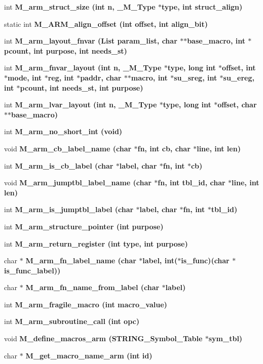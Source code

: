 \begin{CompactItemize}
\item 
int \bf{M\_\-arm\_\-struct\_\-size} (int n, \bf{\_\-M\_\-Type} $\ast$type, int struct\_\-align)
\item 
static int \bf{M\_\-ARM\_\-align\_\-offset} (int offset, int align\_\-bit)
\item 
int \bf{M\_\-arm\_\-layout\_\-fnvar} (\bf{List} param\_\-list, char $\ast$$\ast$base\_\-macro, int $\ast$pcount, int purpose, int needs\_\-st)
\item 
int \bf{M\_\-arm\_\-fnvar\_\-layout} (int n, \bf{\_\-M\_\-Type} $\ast$type, long int $\ast$offset, int $\ast$\bf{mode}, int $\ast$reg, int $\ast$paddr, char $\ast$$\ast$macro, int $\ast$su\_\-sreg, int $\ast$su\_\-ereg, int $\ast$pcount, int needs\_\-st, int purpose)
\item 
int \bf{M\_\-arm\_\-lvar\_\-layout} (int n, \bf{\_\-M\_\-Type} $\ast$type, long int $\ast$offset, char $\ast$$\ast$base\_\-macro)
\item 
int \bf{M\_\-arm\_\-no\_\-short\_\-int} (void)
\item 
void \bf{M\_\-arm\_\-cb\_\-label\_\-name} (char $\ast$fn, int cb, char $\ast$line, int len)
\item 
int \bf{M\_\-arm\_\-is\_\-cb\_\-label} (char $\ast$label, char $\ast$fn, int $\ast$cb)
\item 
void \bf{M\_\-arm\_\-jumptbl\_\-label\_\-name} (char $\ast$fn, int tbl\_\-id, char $\ast$line, int len)
\item 
int \bf{M\_\-arm\_\-is\_\-jumptbl\_\-label} (char $\ast$label, char $\ast$fn, int $\ast$tbl\_\-id)
\item 
int \bf{M\_\-arm\_\-structure\_\-pointer} (int purpose)
\item 
int \bf{M\_\-arm\_\-return\_\-register} (int type, int purpose)
\item 
char $\ast$ \bf{M\_\-arm\_\-fn\_\-label\_\-name} (char $\ast$label, int($\ast$is\_\-func)(char $\ast$is\_\-func\_\-label))
\item 
char $\ast$ \bf{M\_\-arm\_\-fn\_\-name\_\-from\_\-label} (char $\ast$label)
\item 
int \bf{M\_\-arm\_\-fragile\_\-macro} (int macro\_\-value)
\item 
int \bf{M\_\-arm\_\-subroutine\_\-call} (int opc)
\item 
void \bf{M\_\-define\_\-macros\_\-arm} (\bf{STRING\_\-Symbol\_\-Table} $\ast$sym\_\-tbl)
\item 
char $\ast$ \bf{M\_\-get\_\-macro\_\-name\_\-arm} (int id)
\item 
$$
\end{CompactItemize}
